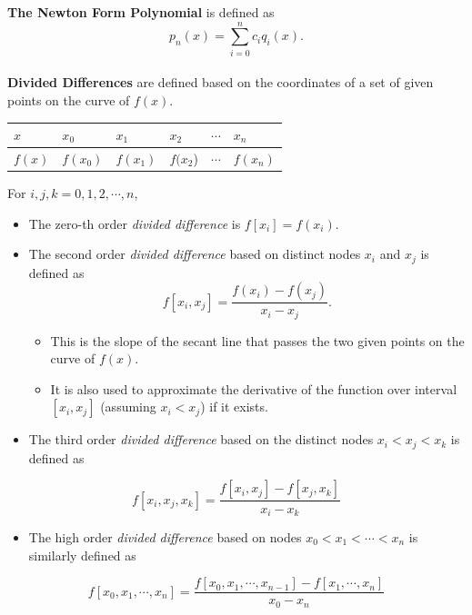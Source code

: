 \documentclass[
]{book}
\providecommand{\tightlist}{%
  \setlength{\itemsep}{0pt}\setlength{\parskip}{0pt}}
\begin{document}
\hfill\break

\textbf{The Newton Form Polynomial} is defined as
\[
p_n(x) = \sum_{i=0}^nc_i q_i(x).
\]\\

\textbf{Divided Differences} are defined based on the coordinates of a set of given points on the curve of \(f(x)\).

\begin{longtable}[]{@{}llllll@{}}
\toprule\noalign{}
\(x\) & \(x_0\) & \(x_1\) & \(x_2\) & \(\cdots\) & \(x_n\) \\
\midrule\noalign{}
\endhead
\bottomrule\noalign{}
\endlastfoot
\(f(x)\) & \(f(x_0)\) & \(f(x_1)\) & \(f(x_2\)) & \(\cdots\) & \(f(x_n)\) \\
\end{longtable}

For \(i, j, k = 0, 1, 2, \cdots, n\),

\begin{itemize}
\item
  The zero-th order \emph{divided difference} is \(f[x_i] = f(x_i)\).
\item
  The second order \emph{divided difference} based on distinct nodes \(x_i\) and \(x_j\) is defined as
  \[
  f[x_i, x_j] = \frac{f(x_i) - f(x_j)}{x_i - x_j}.
  \]

  \begin{itemize}
  \tightlist
  \item
    This is the slope of the secant line that passes the two given points on the curve of \(f(x)\).
  \item
    It is also used to approximate the derivative of the function over interval \([x_i, x_j]\) (assuming \(x_i < x_j\)) if it exists.
  \end{itemize}
\item
  The third order \emph{divided difference} based on the distinct nodes \(x_i < x_j < x_k\) is defined as
\end{itemize}

\[
f[x_i, x_j, x_k] = \frac{f[x_i, x_j] - f[x_j, x_k]}{x_i-x_k}
\]

\begin{itemize}
\tightlist
\item
  The high order \emph{divided difference} based on nodes \(x_0 < x_1 < \cdots < x_n\) is similarly defined as
\end{itemize}

\[
f[x_0, x_1, \cdots, x_n] = \frac{f[x_0, x_1, \cdots, x_{n-1}] - f[x_1, \cdots, x_n]}{x_0-x_n}
\]
\end{document}
